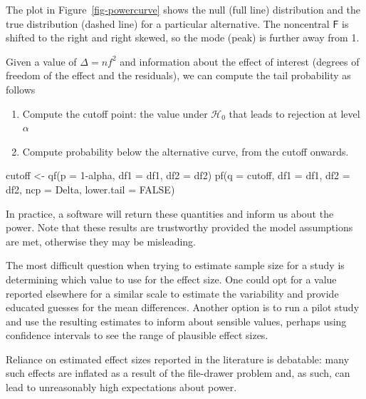 \documentclass[
  11pt,
  letterpaper,
]{scrbook}
\newenvironment{Shaded}{\begin{snugshade}}{\end{snugshade}}
\newcommand{\AttributeTok}[1]{\textcolor[rgb]{0.40,0.45,0.13}{#1}}
\newcommand{\ConstantTok}[1]{\textcolor[rgb]{0.56,0.35,0.01}{#1}}
\newcommand{\DecValTok}[1]{\textcolor[rgb]{0.68,0.00,0.00}{#1}}
\newcommand{\FunctionTok}[1]{\textcolor[rgb]{0.28,0.35,0.67}{#1}}
\newcommand{\NormalTok}[1]{\textcolor[rgb]{0.00,0.23,0.31}{#1}}
\newcommand{\OtherTok}[1]{\textcolor[rgb]{0.00,0.23,0.31}{#1}}
\newcommand{\SpecialCharTok}[1]{\textcolor[rgb]{0.37,0.37,0.37}{#1}}
\providecommand{\tightlist}{%
  \setlength{\itemsep}{0pt}\setlength{\parskip}{0pt}}\usepackage{longtable,booktabs,array}
\theoremstyle{definition}
\theoremstyle{remark}
\begin{document}
The plot in Figure~\ref{fig-powercurve} shows the null (full line)
distribution and the true distribution (dashed line) for a particular
alternative. The noncentral \(\mathsf{F}\) is shifted to the right and
right skewed, so the mode (peak) is further away from 1.

Given a value of \(\Delta=nf^2\) and information about the effect of
interest (degrees of freedom of the effect and the residuals), we can
compute the tail probability as follows

\begin{enumerate}
\def\labelenumi{\arabic{enumi}.}
\tightlist
\item
  Compute the cutoff point: the value under \(\mathscr{H}_0\) that leads
  to rejection at level \(\alpha\)
\item
  Compute probability below the alternative curve, from the cutoff
  onwards.
\end{enumerate}

\begin{Shaded}
\begin{Highlighting}[]
\NormalTok{cutoff }\OtherTok{\textless{}{-}} \FunctionTok{qf}\NormalTok{(}\AttributeTok{p =} \DecValTok{1}\SpecialCharTok{{-}}\NormalTok{alpha, }\AttributeTok{df1 =}\NormalTok{ df1, }\AttributeTok{df2 =}\NormalTok{ df2)}
\FunctionTok{pf}\NormalTok{(}\AttributeTok{q =}\NormalTok{ cutoff,  }\AttributeTok{df1 =}\NormalTok{ df1, }\AttributeTok{df2 =}\NormalTok{ df2, }
    \AttributeTok{ncp =}\NormalTok{ Delta, }\AttributeTok{lower.tail =} \ConstantTok{FALSE}\NormalTok{)}
\end{Highlighting}
\end{Shaded}

In practice, a software will return these quantities and inform us about
the power. Note that these results are trustworthy provided the model
assumptions are met, otherwise they may be misleading.

The most difficult question when trying to estimate sample size for a
study is determining which value to use for the effect size. One could
opt for a value reported elsewhere for a similar scale to estimate the
variability and provide educated guesses for the mean differences.
Another option is to run a pilot study and use the resulting estimates
to inform about sensible values, perhaps using confidence intervals to
see the range of plausible effect sizes.

Reliance on estimated effect sizes reported in the literature is
debatable: many such effects are inflated as a result of the file-drawer
problem and, as such, can lead to unreasonably high expectations about
power.
\end{document}
